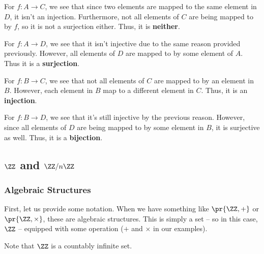 \documentclass[openany]{book}
\begin{document}
\begin{solution}
	For $f : A \rightarrow C$, we see that since two elements are mapped to the same element in $D$, it isn't an injection. Furthermore, not all elements of $C$ are being mapped to by $f$, so it is not a surjection either. Thus, it is \textbf{neither}.
	
	For $f : A \rightarrow D$, we see that it isn't injective due to the same reason provided previously. However, all elements of $D$ are mapped to by some element of $A$. Thus it is a \textbf{surjection}.
	
	For $f: B \rightarrow C$, we see that not all elements of $C$ are mapped to by an element in $B$. However, each element in $B$ map to a different element in $C$. Thus, it is an \textbf{injection}.
	
	For $f : B \rightarrow D$, we see that it's still injective by the previous reason. However, since all elements of $D$ are being mapped to by some element in $B$, it is surjective as well. Thus, it is a \textbf{bijection}.
\end{solution}

\subsection{$\ZZ$ and $\ZZ/n\ZZ$}
\subsubsection{Algebraic Structures}
First, let us provide some notation. When we have something like $\pr{\ZZ, +}$ or $\pr{\ZZ, \times}$, these are algebraic structures. This is simply a set -- so in this case, $\ZZ$ -- equipped with some operation ($+$ and $\times$ in our examples).

\begin{warn}
	Note that $\ZZ$ is a countably infinite set.
\end{warn}
\end{document}

